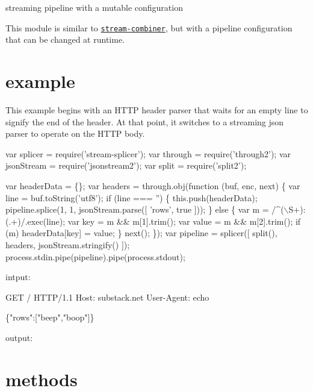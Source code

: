 streaming pipeline with a mutable configuration

This module is similar to \href{https://npmjs.org/package/stream-combiner}{\tt stream-\/combiner}, but with a pipeline configuration that can be changed at runtime.

\href{http://travis-ci.org/browserify/stream-splicer}{\tt }

\section*{example}

This example begins with an H\+T\+TP header parser that waits for an empty line to signify the end of the header. At that point, it switches to a streaming json parser to operate on the H\+T\+TP body.


\begin{DoxyCode}
var splicer = require('stream-splicer');
var through = require('through2');
var jsonStream = require('jsonstream2');
var split = require('split2');

var headerData = \{\};
var headers = through.obj(function (buf, enc, next) \{
    var line = buf.toString('utf8');
    if (line === '') \{
        this.push(headerData);
        pipeline.splice(1, 1, jsonStream.parse([ 'rows', true ]));
    \}
    else \{
        var m = /^(\(\backslash\)S+):(.+)/.exec(line);
        var key = m && m[1].trim();
        var value = m && m[2].trim();
        if (m) headerData[key] = value;
    \}
    next();
\});
var pipeline = splicer([ split(), headers, jsonStream.stringify() ]);
process.stdin.pipe(pipeline).pipe(process.stdout);
\end{DoxyCode}


intput\+:


\begin{DoxyCode}
GET / HTTP/1.1
Host: substack.net
User-Agent: echo

\{"rows":["beep","boop"]\}
\end{DoxyCode}


output\+:




\section*{methods}



